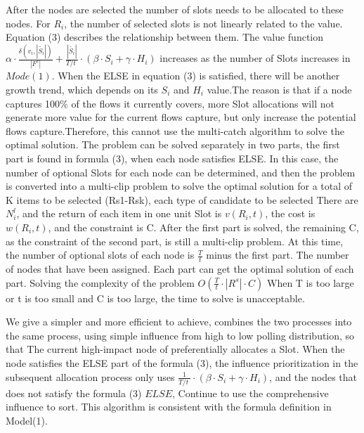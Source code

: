 \documentclass[conference,compsoc]{IEEEtran}
\begin{document}
After the nodes are selected the number of slots needs to be allocated to these nodes. For $R_i$, the number of selected slots is not linearly related to the value. Equation (3) describes the relationship between them. The value function $\alpha \cdot \frac{\delta ({{v}_{i}},\left| \widetilde{{{S}_{i}}} \right|)}{\left| {{F}^{c}} \right|}+\frac{\left| \widetilde{{{S}_{i}}} \right|}{{T}/{t}\;}\cdot (\beta \cdot {{S}_{i}}+\gamma \cdot {{H}_{i}})$ increases as the number of Slots increases in $Mode(1)$. When the ELSE in equation (3) is satisfied, there will be another growth trend, which depends on its $S_i$ and $H_i$ value.The reason is that if a node captures 100\% of the flows it currently covers, more Slot allocations will not generate more value for the current flows capture, but only increase the potential flows capture.Therefore, this cannot use the multi-catch algorithm to solve the optimal solution. The problem can be solved separately in two parts, the first part is found in formula (3), when each node satisfies ELSE. In this case, the number of optional Slots for each node can be determined, and then the problem is converted into a multi-clip problem to solve the optimal solution for a total of K items to be selected (Rs1-Rsk), each type of candidate to be selected There are $N^l_i$, and the return of each item in one unit Slot is $v(R_i,t)$, the cost is $w(R_i,t)$, and the constraint is C. After the first part is solved, the remaining C, as the constraint of the second part, is still a multi-clip problem. At this time, the number of optional slots of each node is $\frac{T}{t} $ minus the first part. The number of nodes that have been assigned. Each part can get the optimal solution of each part. Solving the complexity of the problem $O(\frac{T}{t} \cdot |R^s| \cdot C)$ When T is too large or t is too small and C is too large, the time to solve is unacceptable. 

We give a simpler and more efficient to achieve, combines the two processes into the same process, using simple influence from high to low polling distribution, so that The current high-impact node of preferentially allocates a Slot. When the node satisfies the ELSE part of the formula (3), the influence prioritization in the subsequent allocation process only uses $\frac{1}{{T}/{t}\;}\cdot (\beta \cdot {{S}_{i}}+\gamma \cdot {{H}_{i}})$, and the nodes that does not satisfy the formula (3) $ELSE$, Continue to use the comprehensive influence to sort. This algorithm is consistent with the formula definition in Model(1).
\end{document}
